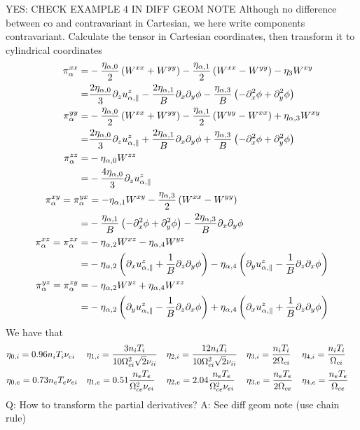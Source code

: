 YES: CHECK EXAMPLE 4 IN DIFF GEOM NOTE
%
Although no difference between co and contravariant in Cartesian, we here write
components contravariant. Calculate the tensor in Cartesian coordinates, then
transform it to cylindrical coordinates
%
\begin{align*}
    \pi^{xx}_{\alpha}
    =& -\frac{\eta_{\alpha,0}}{2}\left(W^{xx} + W^{yy}\right)
       -\frac{\eta_{\alpha,1}}{2}\left(W^{xx} - W^{yy}\right)
       -\eta_3 W^{xy}
    \\
    =&  \frac{2\eta_{\alpha,0}}{3}\partial_z u^{z}_{\alpha,\|}
       -\frac{2\eta_{\alpha,1}}{B}\partial_x \partial_y \phi
       -\frac{ \eta_{\alpha,3}}{B}\left(-\partial_x^2 \phi
       + \partial_y^2 \phi \right)
    \\
\pi^{yy}_{\alpha}
    =& -\frac{\eta_{\alpha,0}}{2}\left(W^{xx} + W^{yy}\right)
       -\frac{\eta_{\alpha,1}}{2}\left(W^{yy} - W^{xx}\right)
       +\eta_{\alpha,3}W^{xy}
    \\
    =&  \frac{2\eta_{\alpha,0}}{3}\partial_z u^{z}_{\alpha,\|}
       +\frac{2\eta_{\alpha,1}}{B}\partial_x \partial_y \phi
       +\frac{ \eta_{\alpha,3}}{B}\left(-\partial_x^2 \phi + \partial_y^2 \phi \right)
    \\
\pi^{zz}_{\alpha}
    =& -\eta_{\alpha,0}W^{zz}
    \\
    =& - \frac{4\eta_{\alpha,0}}{3} \partial_z u^{z}_{\alpha,\|}
    \\
    \pi^{xy}_{\alpha} = \pi^{yx}_{\alpha}
    &= -\eta_{\alpha,1}W^{xy} -\frac{\eta_{\alpha,3}}{2} \left(W^{xx}-W^{yy}\right)
    \\
    =& -\frac{\eta_{\alpha,1}}{B}\left(-\partial_x^2 \phi + \partial_y^2 \phi \right)
    -\frac{2\eta_{\alpha,3}}{B}\partial_x \partial_y \phi
    \\
    \pi^{xz}_{\alpha} = \pi^{zx}_{\alpha}
    =& -\eta_{\alpha,2}W^{xz} - \eta_{\alpha,4}W^{yz}
    \\
    =& -\eta_{\alpha,2}\left(\partial_x u^{z}_{\alpha, \|} + \frac{1}{B}\partial_z \partial_y \phi\right)
        - \eta_{\alpha,4}\left(\partial_y u^{z}_{\alpha,\|} - \frac{1}{B} \partial_z \partial_x \phi\right)
    \\
    \pi^{yz}_{\alpha} = \pi^{zy}_{\alpha}
=& -\eta_{\alpha,2}W^{yz} + \eta_{\alpha,4}W^{xz}
    \\
    =& -\eta_{\alpha,2}\left(\partial_y u^{z}_{\alpha,\|} - \frac{1}{B} \partial_z \partial_x \phi\right)
    + \eta_{\alpha,4}\left(\partial_x u^{z}_{\alpha, \|} + \frac{1}{B}\partial_z \partial_y \phi\right)
\end{align*}
%
We have that
%
\begin{align*}
    &\eta_{0,i}=0.96n_iT_i\nu_{ei} &
    &\eta_{1,i}=\frac{3n_iT_i}{10\Omega_{ci}^2 \sqrt{2}\nu_{ii}} &
    &\eta_{2,i}=\frac{12n_iT_i}{10\Omega_{ci}^2\sqrt{2}\nu_{ii}} &
    &\eta_{3,i}=\frac{n_iT_i}{2\Omega_{ci}} &
    &\eta_{4,i}=\frac{n_iT_i}{\Omega_{ci}} &
    \\
    &\eta_{0,e}=0.73n_eT_e\nu_{ei} &
    &\eta_{1,e}=0.51\frac{n_eT_e}{\Omega_{ce}^2\nu_{ei}} &
    &\eta_{2,e}=2.04\frac{n_eT_e}{\Omega_{ce}^2\nu_{ei}} &
    &\eta_{3,e}=\frac{n_eT_e}{2\Omega_{ce}} &
    &\eta_{4,e}=\frac{n_eT_e}{\Omega_{ce}} &
\end{align*}
Q: How to transform the partial derivatives?
A: See diff geom note (use chain rule)

